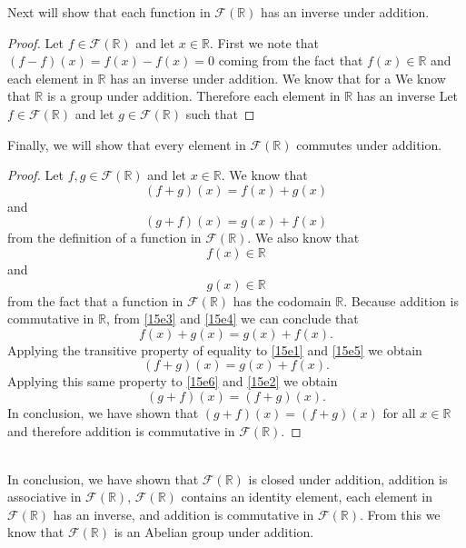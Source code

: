 \documentclass[11pt,a4paper]{article}
\begin{document}
Next will show that each function in $\mathcal{F}(\mathbb{R})$ has an inverse under addition.
\begin{proof}
Let $f\in\mathcal{F}(\mathbb{R})$ and let $x\in\mathbb{R}$. First we note that $(f-f)(x)=f(x)-f(x)=0$ coming from the fact that $f(x)\in\mathbb{R}$ and each element in $\mathbb{R}$ has an inverse under addition. We know that  for a We know that $\mathbb{R}$ is a group under addition. Therefore each element in $\mathbb{R}$ has an inverse
Let $f\in\mathcal{F}(\mathbb{R})$ and let $g\in\mathcal{F}(\mathbb{R})$ such that 
\end{proof}
Finally, we will show that every element in $\mathcal{F}(\mathbb{R})$ commutes under addition.
\begin{proof}
Let $f,g\in\mathcal{F}(\mathbb{R})$ and let $x\in\mathbb{R}$. We know that
\begin{equation}\label{15e1}
(f+g)(x)= f(x)+g(x)
\end{equation}
and
\begin{equation}\label{15e2}
(g+f)(x)=g(x)+f(x)
\end{equation}
from the definition of a function in $\mathcal{F}(\mathbb{R})$. We also know that
\begin{equation}\label{15e3}
f(x)\in\mathbb{R}
\end{equation}
and
\begin{equation}\label{15e4}
g(x)\in\mathbb{R}
\end{equation}
from the fact that a function in $\mathcal{F}(\mathbb{R})$ has the codomain $\mathbb{R}$. Because addition is commutative in $\mathbb{R}$, from \eqref{15e3} and \eqref{15e4} we can conclude that
\begin{equation}\label{15e5}
f(x)+g(x)=g(x)+f(x).
\end{equation}
Applying the transitive property of equality to \eqref{15e1} and \eqref{15e5} we obtain
\begin{equation}\label{15e6}
(f+g)(x)=g(x)+f(x).
\end{equation}
Applying this same property to \eqref{15e6} and \eqref{15e2} we obtain
\[(g+f)(x)=(f+g)(x).\]
In conclusion, we have shown that $(g+f)(x)=(f+g)(x)$ for all $x\in\mathbb{R}$ and therefore addition is commutative in $\mathcal{F}(\mathbb{R})$.
\end{proof}
~\\
In conclusion, we have shown that $\mathcal{F}(\mathbb{R})$ is closed under addition, addition is associative in $\mathcal{F}(\mathbb{R})$, $\mathcal{F}(\mathbb{R})$ contains an identity element, each element in $\mathcal{F}(\mathbb{R})$ has an inverse, and addition is commutative in $\mathcal{F}(\mathbb{R})$. From this we know that $\mathcal{F}(\mathbb{R})$ is an Abelian group under addition.\\
\end{document}
